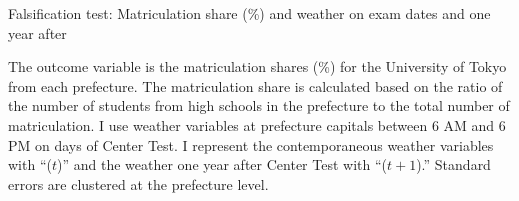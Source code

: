 \documentclass[12pt,letterpaper]{article}
\begin{document}
\begin{table}[H]
  \center
  \caption{Falsification test: Matriculation share (\%) and weather on exam dates and one year after}
  \scriptsize
  
  \label{tab:reg_placebo_exam}
  \scriptsize
  \begin{tablenotes}
    \item
      The outcome variable is the matriculation shares (\%) for the University of Tokyo from each prefecture.
      The matriculation share is calculated based on the ratio of the number of students from high schools in the prefecture to the total number of matriculation.
      I use weather variables at prefecture capitals between 6 AM and 6 PM on days of Center Test.
      I represent the contemporaneous weather variables with ``($t$)'' and the weather one year after Center Test with ``($t + 1$).''
      Standard errors are clustered at the prefecture level.
  \end{tablenotes}
\end{table}

  
\end{document}
